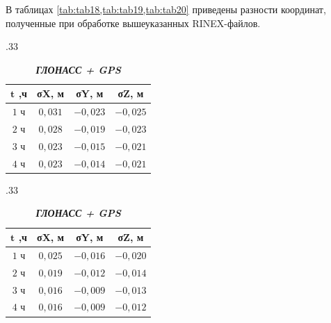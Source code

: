 В таблицах \cref{tab:tab18,tab:tab19,tab:tab20} приведены разности координат, полученные при обработке вышеуказанных RINEX-файлов.


\begin{table} [htbp]
	\centering\small
	\label{tab:tab18}{%
		\hfill
		\begin{subtable}{.33\linewidth}	
			\centering
			\caption*{\textbf{\textit{GPS}}}
			\begin{tabular}{|c|c|c|c|}
				\hline
				$\mathbf{t}$ \textbf{,ч}   & \textbf{σX, м}    & \textbf{σY, м}  & \textbf{σZ, м} \\ \hline
				$1$ ч                      & $ 0,031$          & $-0,023$        & $-0,025$        \\ \hline
				$2$ ч                      & $ 0,028$          & $-0,019$        & $-0,023$        \\ \hline
				$3$ ч                      & $ 0,023$          & $-0,015$        & $-0,021$        \\ \hline
				$4$ ч	                   & $ 0,023$          & $-0,014$        & $-0,021$        \\ \hline
			\end{tabular}
		\end{subtable}%
		\qquad
		\begin{subtable}{.33\linewidth}	
			\centering
			\caption*{\textbf{\textit{ГЛОНАСС + GPS}}}
			\begin{tabular}{|c|c|c|c|}
				\hline
				$\mathbf{t}$ \textbf{,ч}   & \textbf{σX, м}    & \textbf{σY, м}  & \textbf{σZ, м}  \\ \hline
				$1$ ч                      & $ 0,025$          & $-0,016$        & $-0,020$        \\ \hline
				$2$ ч                      & $ 0,019$          & $-0,012$        & $-0,014$        \\ \hline
				$3$ ч                      & $ 0,016$          & $-0,009$        & $-0,013$        \\ \hline
				$4$ ч	                   & $ 0,016$          & $-0,009$        & $-0,012$        \\ \hline
			\end{tabular}
		\end{subtable}\hfill%
	}
\end{table}


